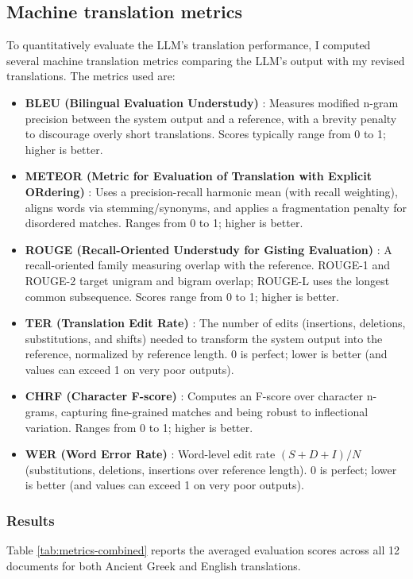 \subsection{Machine translation metrics} \label{sec:metrics}
To quantitatively evaluate the LLM's translation performance, I computed several machine translation metrics comparing the LLM's output with my revised translations.
The metrics used are:
\begin{itemize}
  \item \textbf{BLEU (Bilingual Evaluation Understudy)} \cite{bleu}: Measures modified n\mbox{-}gram precision between the system output and a reference, with a brevity penalty to discourage overly short translations. Scores typically range from 0 to 1; higher is better.
  \item \textbf{METEOR (Metric for Evaluation of Translation with Explicit ORdering)} \cite{meteor}: Uses a precision-recall harmonic mean (with recall weighting), aligns words via stemming/synonyms, and applies a fragmentation penalty for disordered matches. Ranges from 0 to 1; higher is better.
  \item \textbf{ROUGE (Recall-Oriented Understudy for Gisting Evaluation)} \cite{rouge}: A recall-oriented family measuring overlap with the reference. ROUGE-1 and ROUGE-2 target unigram and bigram overlap; ROUGE-L uses the longest common subsequence. Scores range from 0 to 1; higher is better.
  \item \textbf{TER (Translation Edit Rate)} \cite{ter}: The number of edits (insertions, deletions, substitutions, and shifts) needed to transform the system output into the reference, normalized by reference length. $0$ is perfect; lower is better (and values can exceed 1 on very poor outputs).
  \item \textbf{CHRF (Character F-score)} \cite{chrf}: Computes an F-score over character n-grams, capturing fine-grained matches and being robust to inflectional variation. Ranges from 0 to 1; higher is better.
  \item \textbf{WER (Word Error Rate)} \cite{wer}: Word-level edit rate $(S{+}D{+}I)/N$ (substitutions, deletions, insertions over reference length). $0$ is perfect; lower is better (and values can exceed 1 on very poor outputs).
\end{itemize}

\subsubsection{Results}
Table \ref{tab:metrics-combined} reports the averaged evaluation scores across all 12 documents for both Ancient Greek and English translations.


